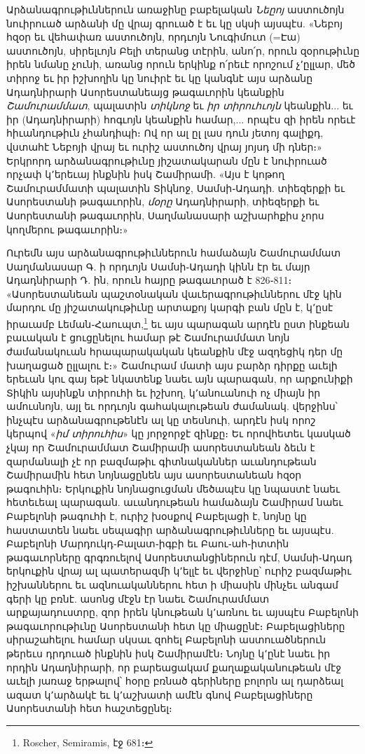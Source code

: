 \documentclass{article}
\begin{document}
{Արձանագրութիւններուն առաջինը բաբելական \emph{Նեըոյ} աստուծոյն նուիրուած արձանի մը վրայ գրուած է եւ կը սկսի այսպէս. «Նեբոյ հզօր եւ վեհափառ աստուծոյն, որդւոյն Նուգիմուտ (=Էա) աստուծոյն, սիրելւոյն Բելի տերանց տէրին, անո՛ր, որուն զօրութիւնը իրեն նմանը չունի, առանց որուն երկինք ո՛րեւէ որոշում չ՚ըլլար, մեծ տիրոջ եւ իր իշխողին կը նուիրէ եւ կը կանգնէ այս արձանը Ադադնիրարի Ասորեստանեայց թագաւորին կեանքին \emph{Շամուրամմատ}, պալատին \emph{տիկնոջ} եւ \emph{իր տիրուհւոյն} կեանքին... եւ իր (Ադադնիրարի) հոգւոյն կեանքին համար,... որպէս զի իրեն որեւէ հիւանդութիւն չհանդիպի։ Ով որ ալ ըլ լաս դուն յետոյ գալիքդ, վստահէ Նեբոյի վրայ եւ ուրիշ աստուծոյ վրայ յոյսդ մի դներ։» Երկրորդ արձանագրութիւնը յիշատակարան մըն է նուիրուած որչափ կ՚երեւայ ինքնին իսկ Շամիրամի. «Այս է կոթող Շամուրամմատի պալատին Տիկնոջ, Սամսի֊Ադադի. տիեզերքի եւ Ասորեստանի թագաւորին, \emph{մօրը} Ադադնիրարի, տիեզերքի եւ Ասորեստանի թագաւորին, Սաղմանասարի աշխարհքիս չորս կողմերու թագաւորին։»

Ուրեմն այս արձանագրութիւններուն համաձայն Շամուրամմատ Սաղմանասար Գ. ի որդւոյն Սամսի֊Ադադի կինն էր եւ մայր Ադադնիրարի Դ. ին, որուն հայրը թագաւորած է 826֊811։ «Ասորեստանեան պաշտօնական վաւերագրութիւններու մէջ կին մարդու մը յիշատակութիւնը արտաքոյ կարգի բան մըն է, կ՚ըսէ իրաւամբ Լեման֊Հաուպտ,\footnote{Roscher, Semiramis, էջ 681։} եւ այս պարագան արդէն ըստ ինքեան բաւական է ցուցընելու համար թէ Շամուրամմատ նոյն ժամանակուան հրապարակական կեանքին մէջ ազդեցիկ դեր մը խաղացած ըլլալու է։» Շամուրամ մատի այս բարձր դիրքը աւելի երեւան կու գայ եթէ նկատենք նաեւ այն պարագան, որ արքունիքի Տիկին այսինքն տիրուհի եւ իշխող, կ՚անուանուի ոչ միայն իր ամուսնոյն, այլ եւ որդւոյն գահակալութեան ժամանակ. վերջինս՝ ինչպէս արձանագրութենէն ալ կը տեսնուի, արդէն իսկ որոշ կերպով «\emph{իմ տիրուհիս}» կը յորջորջէ զինքը։ Եւ որովհետեւ կասկած չկայ որ Շամուրամմատ Շամիրամի ասորեստանեան ձեւն է զարմանալի չէ որ բազմաթիւ գիտնականներ աւանդութեան Շամիրամին հետ նոյնացընեն այս ասորեստանեան հզօր թագուհին։ Երկուքին նոյնացուցման մեծապէս կը նպաստէ նաեւ հետեւեալ պարագան. աւանդութեան համաձայն Շամիրամ նաեւ Բաբելոնի թագուհի է, ուրիշ խօսքով Բաբելացի է, նոյնը կը հաստատեն նաեւ սեպագիր արձանագրութիւնները եւ այսպէս. Բաբելոնի Մարդուկդ֊Բալատ֊իգբի եւ Բաու֊ահ֊իտտին թագաւորները գրգռուելով Ասորեստանցիներուն դէմ, Սամսի֊Ադադ երկուքին վրայ ալ պատերազմի կ՚ելլէ եւ վերջինը՝ ուրիշ բազմաթիւ իշխաններու եւ ազնուականներու հետ ի միասին մինչեւ անգամ գերի կը բռնէ. ասոնց մէջն էր նաեւ Շամուրամմատ արքայադուստրը, զոր իրեն կնութեան կ՚առնու եւ այսպէս Բաբելոնի թագաւորութիւնը Ասորեստանի հետ կը միացընէ։ Բաբելացիները սիրաշահելու համար սկսաւ զոհել Բաբելոնի աստուածներուն թերեւս դրդուած ինքնին իսկ Շամիրամէն։ Նոյնը կ՚ընէ նաեւ իր որդին Ադադնիրարի, որ բարեացակամ քաղաքականութեան մէջ աւելի յառաջ երթալով՝ հօրը բռնած գերիները բոլորն ալ դարձեալ ազատ կ՚արձակէ եւ կ՚աշխատի ամէն գնով Բաբելացիները Ասորեստանի հետ հաշտեցընել։

}
\end{document}
